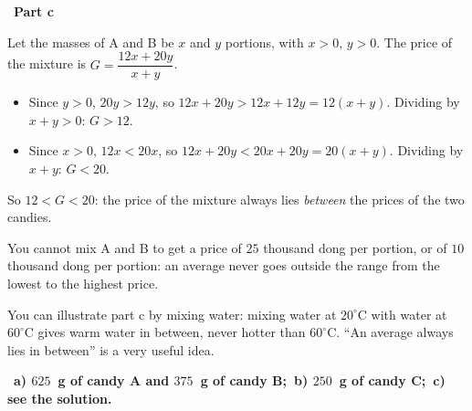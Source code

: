 \documentclass[11pt]{article}
\providecommand{\AnsWord}{Đáp số}
\newcommand{\ans}[1]{\par\smallskip{\bfseries\color{tmGreen!88!black}\AnsWord:}\ {\bfseries\color{AnsRed}#1}\par}
\newcommand{\step}[2]{\par\smallskip\noindent{\bfseries\color{tmBlue!85!black}\StepWord~#1.}\ {\bfseries #2}\par\nopagebreak}
\def\AnsWord{Answer}
\def\StepWord{Step}
\begin{document}
{\step{4}{Part c}
Let the masses of A and B be $x$ and $y$ portions, with $x>0$, $y>0$. The price of the mixture is $G=\dfrac{12x+20y}{x+y}$.
\begin{itemize}[leftmargin=1.3em,itemsep=1pt]
\item Since $y>0$, $20y>12y$, so $12x+20y>12x+12y=12(x+y)$. Dividing by $x+y>0$: $G>12$.
\item Since $x>0$, $12x<20x$, so $12x+20y<20x+20y=20(x+y)$. Dividing by $x+y$: $G<20$.
\end{itemize}
So $12<G<20$: the price of the mixture always lies \emph{between} the prices of the two candies.
\begin{warnbox}You cannot mix A and B to get a price of $25$ thousand dong per portion, or of $10$ thousand dong per portion: an average never goes outside the range from the lowest to the highest price.\end{warnbox}
\begin{parentbox}You can illustrate part c by mixing water: mixing water at $20^\circ$C with water at $60^\circ$C gives warm water in between, never hotter than $60^\circ$C. ``An average always lies in between'' is a very useful idea.\end{parentbox}
\ans{a) $625$~g of candy A and $375$~g of candy B;\ b) $250$~g of candy C;\ c) see the solution.}
}
\end{document}
